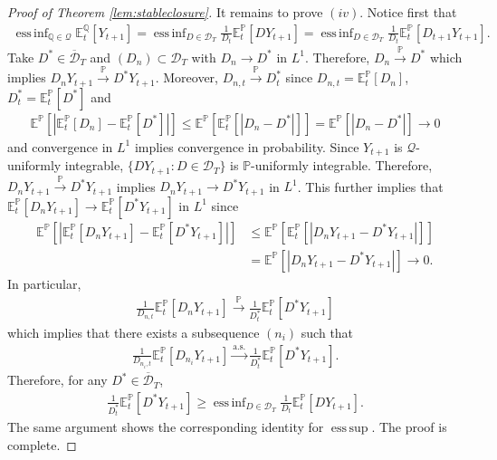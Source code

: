 \documentclass[11pt,a4paper]{article}
\newcommand{\E}{\mathbb{E}}
\DeclareMathOperator*{\esssup}{ess\,sup}
\DeclareMathOperator*{\essinf}{ess\,inf}
\renewcommand{\P}{\mathbb{P}}
\newcommand{\Q}{\mathbb{Q}}
\newcommand{\calQ}{\mathcal{Q}}
\newcommand{\calD}{\mathcal{D}}
\begin{document}
\begin{proof}[Proof of Theorem \ref{lem:stableclosure}]
It remains to prove $(iv)$. 
Notice first that 
\begin{align*}
\essinf_{\Q\in\calQ}\E^{\Q}_t[Y_{t+1}]
=\essinf_{D\in\calD_{T}}\frac{1}{D_t}\E^{\P}_t[DY_{t+1}]
=\essinf_{D\in\calD_{T}}\frac{1}{D_t}\E^{\P}_t[D_{t+1}Y_{t+1}].
\end{align*}
Take $D^*\in\overline{\calD}_{T}$ and $(D_n)\subset \calD_{T}$ with $D_n\to D^*$ in $L^1$. Therefore, 
$D_n\stackrel{\P}{\to}D^*$ which implies $D_nY_{t+1}\stackrel{\P}{\to}D^*Y_{t+1}$. Moreover, $D_{n,t}\stackrel{\P}{\to}D^{*}_t$ since $D_{n,t}=\E^{\P}_t[D_n]$, $D^{*}_{t}=\E^{\P}_t[D^{*}]$ and 
\begin{align*}
\E^{\P}[|\E^{\P}_t[D_n]-\E^{\P}_t[D^{*}]|]\leq \E^{\P}[\E^{\P}_t[|D_n-D^{*}|]]
=\E^{\P}[|D_n-D^{*}|]\to 0
\end{align*}
and convergence in $L^1$ implies convergence in probability. 
Since $Y_{t+1}$ is $\calQ$-uniformly integrable, $\{DY_{t+1}:D\in\calD_{T}\}$ is $\P$-uniformly integrable. Therefore, $D_nY_{t+1}\stackrel{\P}{\to}D^*Y_{t+1}$ implies $D_nY_{t+1}\to D^*Y_{t+1}$ in $L^1$. 
This further implies that $\E^{\P}_t[D_nY_{t+1}]\to \E^{\P}_t[D^*Y_{t+1}]$ in $L^1$ since
\begin{align*}
\E^{\P}[|\E^{\P}_t[D_nY_{t+1}]-\E^{\P}_t[D^*Y_{t+1}]|]
&\leq \E^{\P}[\E^{\P}_t[|D_nY_{t+1}-D^*Y_{t+1}|]]\\
&=\E^{\P}[|D_nY_{t+1}-D^*Y_{t+1}|]\to 0.
\end{align*}
In particular, 
\begin{align*}
\frac{1}{D_{n,t}}\E^{\P}_t[D_nY_{t+1}]\stackrel{\P}{\to} \frac{1}{D^{*}_{t}}\E^{\P}_t[D^{*}Y_{t+1}]
\end{align*}
which implies that there exists a subsequence $(n_i)$ such that 
\begin{align*}
\frac{1}{D_{n_i,t}}\E^{\P}_t[D_{n_i}Y_{t+1}]\stackrel{\text{a.s.}}{\to} \frac{1}{D^{*}_{t}}\E^{\P}_t[D^{*}Y_{t+1}]. 
\end{align*}
Therefore, for any $D^*\in\overline{\calD}_{T}$, 
\begin{align*}
\frac{1}{D^{*}_t}\E^{\P}_t[D^*Y_{t+1}]\geq \essinf_{D\in \calD_{T}}\frac{1}{D_t}\E^{\P}_t[DY_{t+1}].
\end{align*}
The same argument shows the corresponding identity for $\esssup$. The proof is complete.  
\end{proof}
\end{document}
